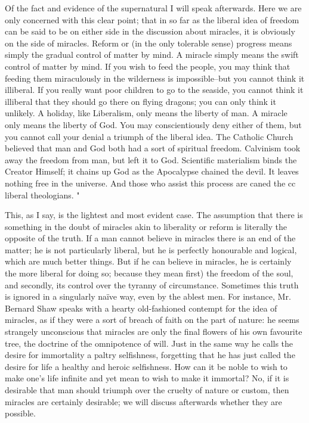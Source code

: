 \documentclass{book}
\begin{document}
Of the fact and evidence of the supernatural I will speak afterwards. Here we are only concerned with this clear point; that in so far as the liberal idea of freedom can be said to be on either side in the discussion about miracles, it is obviously on the side of miracles. Reform or (in the only tolerable sense) progress means simply the gradual control of matter by mind. A miracle simply means the swift control of matter by mind. If you wish to feed the people, you may think that feeding them miraculously in the wilderness is impossible–but you cannot think it illiberal. If you really want poor children to go to the seaside, you cannot think it illiberal that they should go there on flying dragons; you can only think it unlikely. A holiday, like Liberalism, only means the liberty of man. A miracle only means the liberty of God. You may conscientiously deny either of them, but you cannot call your denial a triumph of the liberal idea. The Catholic Church believed that man and God both had a sort of spiritual freedom. Calvinism took away the freedom from man, but left it to God. Scientific materialism binds the Creator Himself; it chains up God as the Apocalypse chained the devil. It leaves nothing free in the universe. And those who assist this process are caned the cc liberal theologians. "

This, as I say, is the lightest and most evident case. The assumption that there is something in the doubt of miracles akin to liberality or reform is literally the opposite of the truth. If a man cannot believe in miracles there is an end of the matter; he is not particularly liberal, but he is perfectly honourable and logical, which are much better things. But if he can believe in miracles, he is certainly the more liberal for doing so; because they mean first) the freedom of the soul, and secondly, its control over the tyranny of circumstance. Sometimes this truth is ignored in a singularly naïve way, even by the ablest men. For instance, Mr. Bernard Shaw speaks with a hearty old-fashioned contempt for the idea of miracles, as if they were a sort of breach of faith on the part of nature: he seems strangely unconscious that miracles are only the final flowers of his own favourite tree, the doctrine of the omnipotence of will. Just in the same way he calls the desire for immortality a paltry selfishness, forgetting that he has just called the desire for life a healthy and heroic selfishness. How can it be noble to wish to make one’s life infinite and yet mean to wish to make it immortal? No, if it is desirable that man should triumph over the cruelty of nature or custom, then miracles are certainly desirable; we will discuss afterwards whether they are possible.
\end{document}
